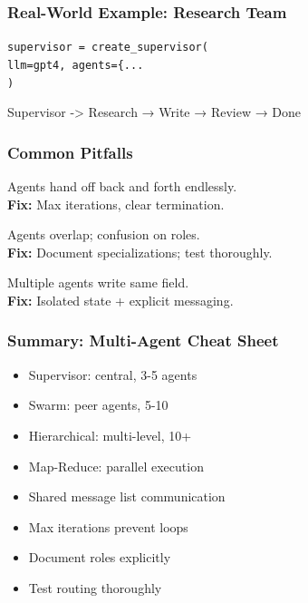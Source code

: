 \documentclass[aspectratio=169,11pt]{beamer}
\begin{document}
\begin{frame}
\frametitle{Real-World Example: Research Team}
\begin{tipbox}
\texttt{supervisor = create\_supervisor(}\\
\texttt{llm=gpt4, agents=\{...}\\
\texttt{)}
\end{tipbox}
\vspace{0.1cm}
\begin{tipbox}[Flow]
Supervisor -> Research → Write → Review → Done
\end{tipbox}
\end{frame}

\begin{frame}
\frametitle{Common Pitfalls}
\begin{warningbox}
Agents hand off back and forth endlessly.\\
\textbf{Fix:} Max iterations, clear termination.
\end{warningbox}
\vspace{0.08cm}
\begin{warningbox}
Agents overlap; confusion on roles.\\
\textbf{Fix:} Document specializations; test thoroughly.
\end{warningbox}
\vspace{0.08cm}
\begin{warningbox}
Multiple agents write same field.\\
\textbf{Fix:} Isolated state + explicit messaging.
\end{warningbox}
\end{frame}

\begin{frame}
\frametitle{Summary: Multi-Agent Cheat Sheet}
\begin{conceptbox}
\setlength{\itemsep}{1pt}
\begin{itemize}
\item Supervisor: central, 3-5 agents
\item Swarm: peer agents, 5-10
\item Hierarchical: multi-level, 10+
\item Map-Reduce: parallel execution
\item Shared message list communication
\item Max iterations prevent loops
\item Document roles explicitly
\item Test routing thoroughly
\end{itemize}
\end{conceptbox}
\end{frame}
\end{document}
